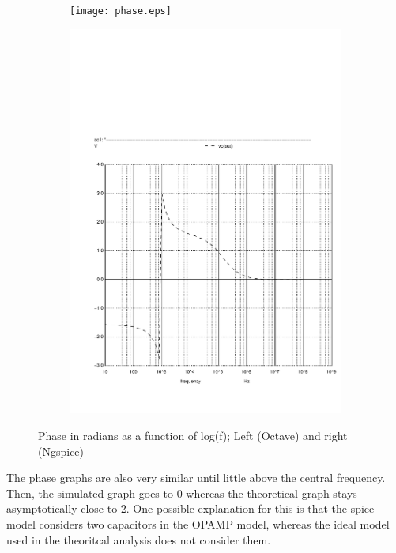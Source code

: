 \begin{figure}[h]
    \centering
    \begin{subfigure}{0.5\textwidth}
      \texttt{[image: phase.eps]}
    \end{subfigure}
    \begin{subfigure}{0.4\textwidth}
      \includegraphics[width=\linewidth, clip]{phase.pdf}
    \end{subfigure}
    \caption{Phase in radians as a function of log(f); Left (Octave) and right (Ngspice) }
    \label{fig:output1}
\end{figure}

The phase graphs are also very similar until little above the central frequency. Then, the simulated graph goes to 0 whereas the theoretical graph stays asymptotically close to 2.
One possible explanation for this is that the spice model considers two capacitors in the OPAMP model, whereas the ideal model used in the theoritcal analysis does not consider them.

